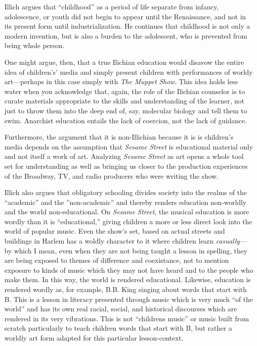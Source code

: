 \documentclass[12pt,letterpaper]{article}
\newcommand{\ses}{\textit{Sesame Street }}
\begin{document}
	Illich argues that ``childhood'' as a period of life separate from 
	infancy, adolescence, or youth did not begin to appear until the 
	Renaissance, and not in its present form until industrialization.
	\autocite[13]{Illich} He continues that childhood is not only a modern
	invention, but is also a burden to the adolescent, who is prevented 
	from being whole person.\autocite[14]{Illich}

	One might argue, then, that a true Ilichian education would disavow the
	entire idea of children's' media and simply present children with 
	performances of worldy art---perhaps in this case simply with 
	\textit{The Muppet Show}. This idea holds less water when you 
	acknowledge that, again, the role of the Ilichian counselor is to curate
	materials appropriate to the skills and understanding of the learner, 
	not just to throw them into the deep end of, say, molecular biology 
	and tell them to swim. Anarchist education entails the lack of coercion,
	not the lack of guidance. 

	Furthermore, the argument that it is non-Illichian because it is
	is children's media depends on the assumption that \ses is educational
	material only and not itself a work of art. 
	Analyzing \ses as art opens a whole tool set for understanding as well
	as bringing us closer to the production experiences of the Broadway, TV,
	and radio producers who were writing the show.  

	Illich also argues that obligatory schooling divides society into the 
	realms of the ``academic'' and the ''non-academic'' and thereby renders
	education non-worldly and the world non-educational.\autocite[12]
	{Illich} On \textit{Sesame Street}, the musical education is more wordly
	than it is ``educational,'' giving children a more or less direct look 
	into the world of popular music. Even the show's set, based on actual
	streets and buildings in Harlem\autocite[154]{Davis} has a
	 woldly character to it where children learn \textit{casually}---by 
	which I mean, even when they are not being taught a lesson in spelling,
	they are being exposed to themes of difference and coexistance, not to 
	mention exposure to kinds of music which they may not have heard 
	and to the people who make them. In this way, the world is rendered 
	educational. Likewise, 
	education is rendered wordly as, for example, B.B. King singing about 
	words that start with B. This is a lesson in literacy presented through
	music which is very much ``of the world'' and has its own real racial, 
	social, and historical discourses which are rendered in its very 
	vibrations. This is not ``childrens music'' or music built from scratch
	particularly to teach children words that start with B, but rather a 
	worldly art form adapted for this particular lesson-context.
\end{document}
